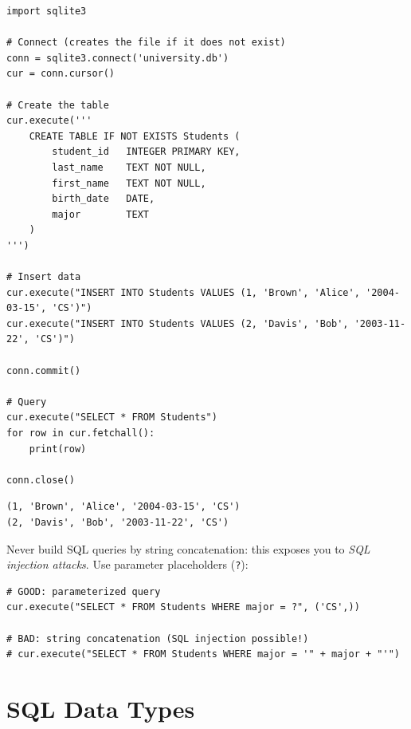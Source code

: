 \begin{codeblock}[title=\textbf{Connecting and Creating Tables with Python}]
\begin{verbatim}
import sqlite3

# Connect (creates the file if it does not exist)
conn = sqlite3.connect('university.db')
cur = conn.cursor()

# Create the table
cur.execute('''
    CREATE TABLE IF NOT EXISTS Students (
        student_id   INTEGER PRIMARY KEY,
        last_name    TEXT NOT NULL,
        first_name   TEXT NOT NULL,
        birth_date   DATE,
        major        TEXT
    )
''')

# Insert data
cur.execute("INSERT INTO Students VALUES (1, 'Brown', 'Alice', '2004-03-15', 'CS')")
cur.execute("INSERT INTO Students VALUES (2, 'Davis', 'Bob', '2003-11-22', 'CS')")

conn.commit()

# Query
cur.execute("SELECT * FROM Students")
for row in cur.fetchall():
    print(row)

conn.close()
\end{verbatim}
\end{codeblock}

\begin{codeoutput}
\begin{verbatim}
(1, 'Brown', 'Alice', '2004-03-15', 'CS')
(2, 'Davis', 'Bob', '2003-11-22', 'CS')
\end{verbatim}
\end{codeoutput}

\begin{bestpractice}[title=\textbf{Use Parameterized Queries}]
Never build SQL queries by string concatenation: this exposes you to
\emph{SQL injection attacks}. Use parameter placeholders (\texttt{?}):
\begin{verbatim}
# GOOD: parameterized query
cur.execute("SELECT * FROM Students WHERE major = ?", ('CS',))

# BAD: string concatenation (SQL injection possible!)
# cur.execute("SELECT * FROM Students WHERE major = '" + major + "'")
\end{verbatim}
\end{bestpractice}

\section{SQL Data Types}

